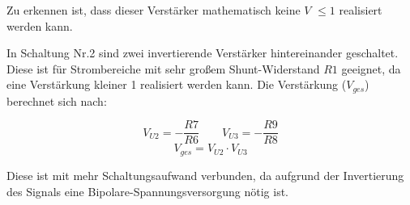 Zu erkennen ist, dass dieser Verstärker mathematisch keine $V$ $\leq 1$ realisiert werden kann.


In Schaltung Nr.2 sind zwei invertierende Verstärker hintereinander geschaltet. 
Diese ist für Strombereiche mit sehr großem Shunt-Widerstand $R1$ geeignet, da eine Verstärkung kleiner 1 
realisiert werden kann.
Die Verstärkung ($V_{ges}$) berechnet sich nach:

\begin{equation}
	V_{U2} = - \frac{R7}{R6}  
		\qquad
	V_{U3} = - \frac{R9}{R8}
\end{equation}
\vspace{0cm}
\begin{equation}
	V_{ges} = V_{U2} \cdot V_{U3}
	\label{eq:V_Inv}
\end{equation}

Diese ist mit mehr Schaltungsaufwand verbunden, da aufgrund der Invertierung des Signals eine 
Bipolare-Spannungsversorgung nötig ist. 


